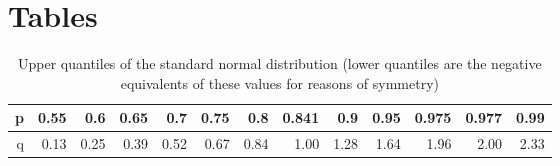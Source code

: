 \chapter{Tables}
\label{ch:tables}

\begin{table}[ht]
\centering
\begin{tabular}{rrrrrrrrrrrrr}
  \hline
 p & 0.55 & 0.6 & 0.65 & 0.7 & 0.75 & 0.8 & 0.841 & 0.9 & 0.95 & 0.975 & 0.977 & 0.99 \\ 
  \hline
 q & 0.13 & 0.25 & 0.39 & 0.52 & 0.67 & 0.84 & 1.00 & 1.28 & 1.64 & 1.96 & 2.00 & 2.33 \\ 
   \hline
\end{tabular}
\caption{Upper quantiles of the standard normal distribution (lower quantiles are the negative equivalents of these values for reasons of symmetry)}
\label{tab:normal}
\end{table}

